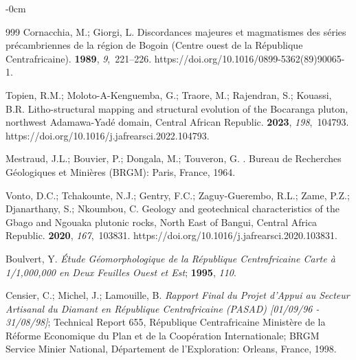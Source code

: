 \documentclass[minerals,article,accept,pdftex,moreauthors]{Definitions/mdpi}
\begin{document}
\begin{adjustwidth}{-\extralength}{0cm}
\begin{thebibliography}{999}
Cornacchia, M.; Giorgi, L.
\newblock Discordances majeures et magmatismes des séries précambriennes de
  la région de Bogoin (Centre ouest de la République Centrafricaine).
 {\bf 1989}, {\em 9},~221--226. %
\newblock https://doi.org/10.1016/0899-5362(89)90065-1.

Topien, R.M.; Moloto-A-Kenguemba, G.; Traore, M.; Rajendran, S.; Kouassi, B.R.
\newblock Litho-structural mapping and structural evolution of the Bocaranga
  pluton, northwest Adamawa-Yadé domain, Central African Republic.
 {\bf 2023}, {\em
  198},~104793.
\newblock https://doi.org/10.1016/j.jafrearsci.2022.104793.

Mestraud, J.L.; Bouvier, P.; Dongala, M.; Touveron, G.
. 
\newblock Bureau de Recherches Géologiques et Minières (BRGM): Paris,
  France, 1964.  

Vonto, D.C.; Tchakounte, N.J.; Gentry, F.C.; Zaguy-Guerembo, R.L.; Zame, P.Z.;
  Djanarthany, S.; Nkoumbou, C.
\newblock Geology and geotechnical characteristics of the Gbago and Ngouaka
  plutonic rocks, North East of Bangui, Central Africa Republic.
 {\bf 2020}, {\em
  167},~103831.
\newblock https://doi.org/10.1016/j.jafrearsci.2020.103831.

Boulvert, Y.
\newblock \emph{Étude Géomorphologique de la République Centrafricaine Carte à
  1/1,000,000 en Deux Feuilles Ouest et Est};
 {\bf 1995}, {\em 110}. %

Censier, C.; Michel, J.; Lamouille, B.
\newblock \emph{Rapport Final du Projet d’Appui au Secteur Artisanal du Diamant en
  République Centrafricaine (PASAD) [01/09/96 - 31/08/98]};
\newblock Technical Report 655, République Centrafricaine Ministère de la
  Réforme Economique du Plan et de la Coopération Internationale; 
\newblock BRGM Service Minier National, Département de l’Exploration: Orleans, France, 1998. %


\end{thebibliography}
\end{adjustwidth}
\end{document}
